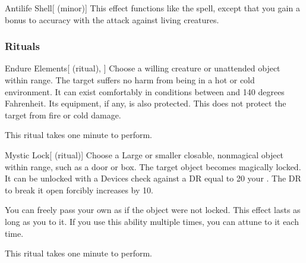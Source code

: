 \lowercase{\hypertarget{spell:Antilife Shell}{}}\label{spell:Antilife Shell}
\begin{apability}[\nth{5}]{\hypertarget{spell:Antilife Shell}{Antilife Shell}}[ (minor)]
This effect functions like the  spell, except that you gain a  bonus to accuracy with the attack against living creatures.
\end{apability}
\vspace{0.25em}



\subsubsection{Rituals}


\lowercase{\hypertarget{spell:Endure Elements}{}}\label{spell:Endure Elements}
\begin{attuneability}[\nth{1}]{\hypertarget{spell:Endure Elements}{Endure Elements}}[ (ritual), ]
Choose a willing creature or unattended object within \rngclose range.
The target suffers no harm from being in a hot or cold environment.
It can exist comfortably in conditions between  and 140 degrees Fahrenheit.
Its equipment, if any, is also protected.
This does not protect the target from fire or cold damage.

This ritual takes one minute to perform.
\end{attuneability}
\vspace{0.25em}



\lowercase{\hypertarget{spell:Mystic Lock}{}}\label{spell:Mystic Lock}
\begin{attuneability}[\nth{2}]{\hypertarget{spell:Mystic Lock}{Mystic Lock}}[ (ritual)]
Choose a Large or smaller closable, nonmagical object within \rngclose range, such as a door or box.
The target object becomes magically locked.
It can be unlocked with a Devices check against a DR equal to 20 \add your .
The DR to break it open forcibly increases by 10.

You can freely pass your own  as if the object were not locked.
This effect lasts as long as you  to it.
If you use this ability multiple times, you can attune to it each time.

This ritual takes one minute to perform.
\end{attuneability}
\vspace{0.25em}



